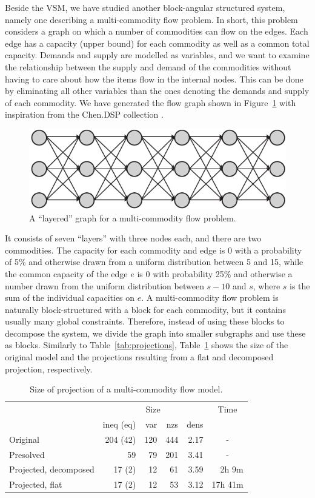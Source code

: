\documentclass{llncs}
\newcommand{\btablesize}{\begin{scriptsize}}
\newcommand{\etablesize}{\end{scriptsize}}
\begin{document}
Beside the VSM, we have studied another block-angular structured system, namely one describing a multi-commodity flow problem.  
In short, this problem considers a graph on which a number of commodities can flow on the edges. Each edge has a capacity (upper bound) for each commodity as well as a common total capacity. Demands and supply are modelled as variables, and we want to examine the relationship between the supply and demand of the commodities without having to care about how the items flow in the internal nodes. This can be done by eliminating all other variables than the ones denoting the demands and supply of each commodity. We have generated the flow graph shown in Figure~\ref{fig:multiflow} with inspiration from the Chen.DSP collection \cite{JLFP93}. 
\begin{figure}[b!]
	\centering
		\includegraphics[scale=0.6]{figures/multiflow2.pdf}
	\caption{A ``layered''  graph for a multi-commodity flow problem.}
	\label{fig:multiflow}
\end{figure}
It consists of seven ``layers'' with three nodes each, and there are two commodities. The capacity for each commodity and edge is 0 with a probability of 5\% and otherwise drawn from a uniform distribution between 5 and 15, while the common capacity of the edge $e$ is 0 with probability 25\% and otherwise a number drawn from the uniform distribution between $s-1$0 and $s$, where $s$ is the sum of the individual capacities on $e$. A multi-commodity flow problem is naturally block-structured with a block for each commodity, but it contains usually many global constraints. Therefore, instead of using these blocks to decompose the system, we divide the graph into smaller subgraphs and use these as blocks. 
%
Similarly to Table~\ref{tab:projections}, Table~\ref{tab:multicom} shows the size of the original model and the projections resulting from a flat and decomposed projection, respectively. 
\begin{table}[b!]
\caption{Size of projection of a multi-commodity flow model.}
\label{tab:multicom}
\centering
\btablesize
\begin{tabular}{l|r@{ / }r@{ / }r@{ / }r|r}
&\multicolumn{4}{c|}{Size}&\multicolumn{1}{c}{Time}\\
											&ineq (eq)&var &nzs &dens&\\
\hline
Original							&204 (42) & 120& 444&2.17&\multicolumn{1}{c}{-}\\
Presolved							& 59		  &  79& 201&3.41&\multicolumn{1}{c}{-}\\
Projected, decomposed	& 17 (2)  &  12&  61&3.59& 2h \phantom{9}9m \\
Projected, flat				& 17 (2)  &  12&  53&3.12& 17h 41m\\
\end{tabular}
\etablesize
\end{table}
\end{document}
